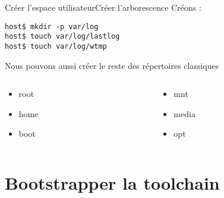 \begin{frame}[fragile=singleslide]{Créer l'espace utilisateur}{Créer l'arborescence}
  Créons :
    \begin{lstlisting}
host$ mkdir -p var/log
host$ touch var/log/lastlog
host$ touch var/log/wtmp
    \end{lstlisting}
  Nous pouvons aussi créer le reste des répertoires classiques
  \vspace{-2ex}
  \begin{columns}[onlytextwidth,t]
    \begin{column}[t]{0.5\textwidth}
      \begin{itemize}
      \item root
      \item home
      \item boot
      \end{itemize}
    \end{column}
    \begin{column}[t]{0.5\textwidth}
      \begin{itemize}
      \item mnt
      \item media
      \item opt
      \end{itemize}
    \end{column}
  \end{columns}
  \vspace{2ex}
\end{frame}

\section{Bootstrapper la toolchain}

